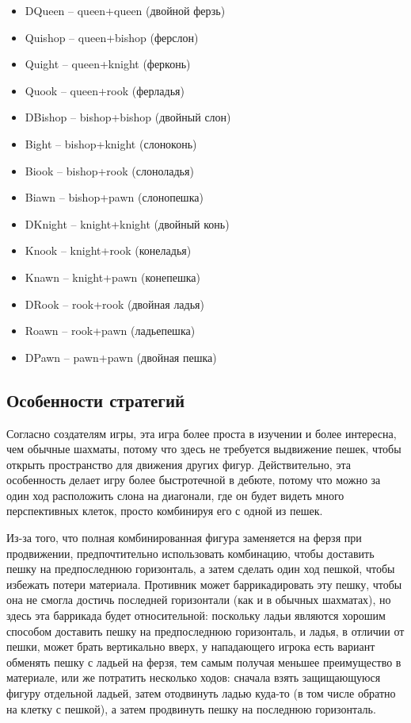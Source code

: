 \documentclass{article}
\begin{document}
\begin{itemize}
    \item DQueen -- queen+queen (двойной ферзь)
    \item Quishop -- queen+bishop (ферслон)
    \item Quight -- queen+knight (ферконь)
    \item Quook -- queen+rook (ферладья)
    \item DBishop -- bishop+bishop (двойный слон)
    \item Bight -- bishop+knight (слоноконь)
    \item Biook -- bishop+rook (слоноладья)
    \item Biawn -- bishop+pawn (слонопешка)
    \item DKnight -- knight+knight (двойный конь)
    \item Knook -- knight+rook (конеладья)
    \item Knawn -- knight+pawn (конепешка)
    \item DRook -- rook+rook (двойная ладья)
    \item Roawn -- rook+pawn (ладьепешка)
    \item DPawn -- pawn+pawn (двойная пешка)
\end{itemize}

\subsection{Особенности стратегий}

Согласно создателям игры, эта игра более проста в изучении и более интересна, чем обычные шахматы,
потому что здесь не требуется выдвижение пешек, чтобы открыть пространство для движения других фигур.
Действительно, эта особенность делает игру более быстротечной в дебюте,
потому что можно за один ход расположить слона на диагонали, где он будет видеть много перспективных клеток,
просто комбинируя его с одной из пешек.

Из-за того, что полная комбинированная фигура заменяется на ферзя при продвижении,
предпочтительно использовать комбинацию, чтобы доставить пешку на предпоследнюю горизонталь,
а затем сделать один ход пешкой, чтобы избежать потери материала.
Противник может баррикадировать эту пешку, чтобы она не смогла достичь последней горизонтали (как и в обычных шахматах),
но здесь эта баррикада будет относительной:
поскольку ладьи являются хорошим способом доставить пешку на предпоследнюю горизонталь,
и ладья, в отличии от пешки, может брать вертикально вверх, 
у нападающего игрока есть вариант обменять пешку с ладьей на ферзя,
тем самым получая меньшее преимущество в материале,
или же потратить несколько ходов: сначала взять защищающуюся фигуру отдельной ладьей, затем отодвинуть ладью куда-то (в том числе обратно на клетку с пешкой),
а затем продвинуть пешку на последнюю горизонталь.
\end{document}
